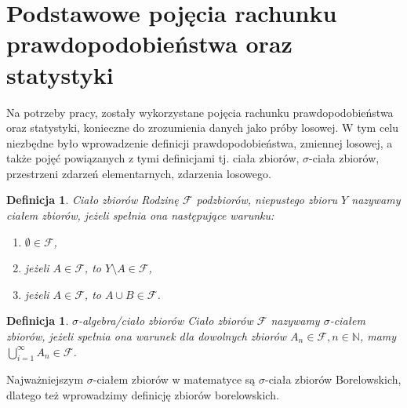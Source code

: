 \documentclass[12pt,a4paper]{report}
\newtheorem{definition}[theorem]{Definicja}
\begin{document}








\section{Podstawowe pojęcia rachunku prawdopodobieństwa oraz statystyki} \label{rachunek prawdopodobienstwa}


Na potrzeby pracy, zostały wykorzystane pojęcia rachunku prawdopodobieństwa oraz statystyki, konieczne do zrozumienia danych jako próby losowej. W tym celu niezbędne było wprowadzenie definicji prawdopodobieństwa, zmiennej losowej, a także pojęć powiązanych z tymi definicjami tj. ciała zbiorów, $\sigma$-ciała zbiorów, przestrzeni zdarzeń elementarnych, zdarzenia losowego.


\begin{definition}{Ciało zbiorów \cite[Rozdział 8.1]{rudnicki2006}}
Rodzinę $\mathcal{F}$ podzbiorów, niepustego zbioru $Y$ nazywamy ciałem zbiorów, jeżeli spełnia ona następujące warunku: 
\begin{enumerate}
\item $\emptyset \in \mathcal{F}$,
\item jeżeli $A \in \mathcal{F}$, to $Y \setminus A \in \mathcal{F}$,
\item jeżeli $A \in \mathcal{F}$, to $A \cup B \in \mathcal{F}$.
\end{enumerate}
\end{definition}


\begin{definition}{$\sigma$-algebra/ciało zbiorów\cite[Rozdział 8.1]{rudnicki2006}}
Ciało zbiorów $\mathcal{F}$ nazywamy $\sigma$-ciałem zbiorów, jeżeli spełnia ona warunek
dla dowolnych zbiorów $A_{n} \in \mathcal{F}, n \in \mathbb{N}$, mamy
$\bigcup\limits_{i=1}^{\infty} A_n \in \mathcal{F}$.
\end{definition}


Najważniejszym $\sigma$-ciałem zbiorów w matematyce są $\sigma$-ciała zbiorów Borelowskich, dlatego też wprowadzimy definicję zbiorów borelowskich. 
\end{document}
